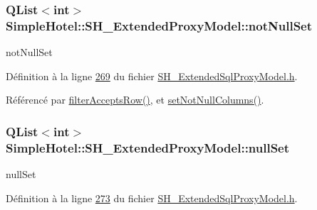 \hypertarget{classSimpleHotel_1_1SH__ExtendedProxyModel_a7c7d8e43d6988da141f1c4ef032839a4}{
\subsubsection[{not\-Null\-Set}]{\setlength{\rightskip}{0pt plus 5cm}Q\-List$<$int$>$ Simple\-Hotel\-::\-S\-H\-\_\-\-Extended\-Proxy\-Model\-::not\-Null\-Set\hspace{0.3cm}{\ttfamily [private]}}}\label{classSimpleHotel_1_1SH__ExtendedProxyModel_a7c7d8e43d6988da141f1c4ef032839a4}


not\-Null\-Set 



Définition à la ligne \hyperlink{SH__ExtendedSqlProxyModel_8h_source_l00269}{269} du fichier \hyperlink{SH__ExtendedSqlProxyModel_8h_source}{S\-H\-\_\-\-Extended\-Sql\-Proxy\-Model.\-h}.



Référencé par \hyperlink{classSimpleHotel_1_1SH__ExtendedProxyModel_a11b30f0f630fe9ddaa778eb9534918e1}{filter\-Accepts\-Row()}, et \hyperlink{classSimpleHotel_1_1SH__ExtendedProxyModel_a0136908081b4423eb0ddd5781654f65d}{set\-Not\-Null\-Columns()}.

\hypertarget{classSimpleHotel_1_1SH__ExtendedProxyModel_a3335d384f2c33af3db4db58af0a359e6}{
\subsubsection[{null\-Set}]{\setlength{\rightskip}{0pt plus 5cm}Q\-List$<$int$>$ Simple\-Hotel\-::\-S\-H\-\_\-\-Extended\-Proxy\-Model\-::null\-Set\hspace{0.3cm}{\ttfamily [private]}}}\label{classSimpleHotel_1_1SH__ExtendedProxyModel_a3335d384f2c33af3db4db58af0a359e6}


null\-Set 



Définition à la ligne \hyperlink{SH__ExtendedSqlProxyModel_8h_source_l00273}{273} du fichier \hyperlink{SH__ExtendedSqlProxyModel_8h_source}{S\-H\-\_\-\-Extended\-Sql\-Proxy\-Model.\-h}.




